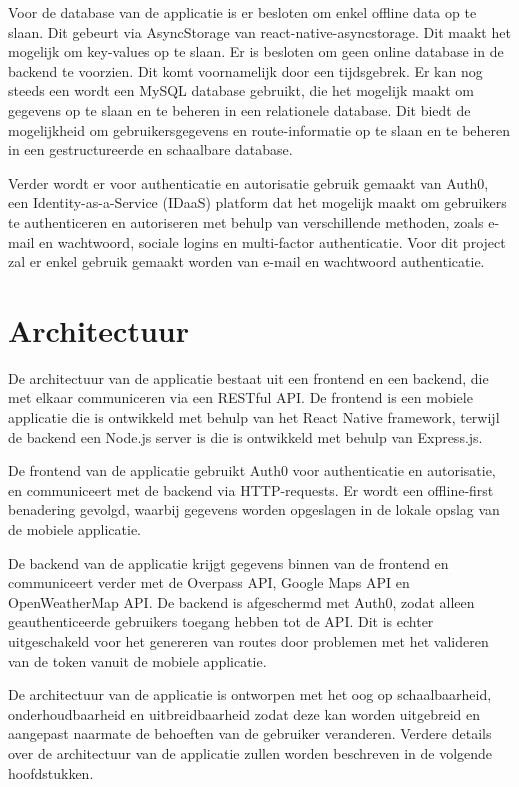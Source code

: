 Voor de database van de applicatie is er besloten om enkel offline data op te slaan. Dit gebeurt via AsyncStorage van react-native-asyncstorage. Dit maakt het mogelijk om key-values op te slaan. 
Er is besloten om geen online database in de backend te voorzien. Dit komt voornamelijk door een tijdsgebrek.
Er kan nog steeds een wordt een MySQL database gebruikt, die het mogelijk maakt om gegevens op te slaan en te beheren in een relationele database. Dit biedt de mogelijkheid om gebruikersgegevens en route-informatie op te slaan en te beheren in een gestructureerde en schaalbare database.

Verder wordt er voor authenticatie en autorisatie gebruik gemaakt van Auth0, een Identity-as-a-Service (IDaaS) platform dat het mogelijk maakt om gebruikers te authenticeren en autoriseren met behulp van verschillende methoden, zoals e-mail en wachtwoord, sociale logins en multi-factor authenticatie. Voor dit project zal er enkel gebruik gemaakt worden van e-mail en wachtwoord authenticatie.

\section{Architectuur}

De architectuur van de applicatie bestaat uit een frontend en een backend, die met elkaar communiceren via een RESTful API. De frontend is een mobiele applicatie die is ontwikkeld met behulp van het React Native framework, terwijl de backend een Node.js server is die is ontwikkeld met behulp van Express.js.

De frontend van de applicatie gebruikt Auth0 voor authenticatie en autorisatie, en communiceert met de backend via HTTP-requests. Er wordt een offline-first benadering gevolgd, waarbij gegevens worden opgeslagen in de lokale opslag van de mobiele applicatie.

De backend van de applicatie krijgt gegevens binnen van de frontend en communiceert verder met de Overpass API, Google Maps API en OpenWeatherMap API. De backend is afgeschermd met Auth0, zodat alleen geauthenticeerde gebruikers toegang hebben tot de API. Dit is echter uitgeschakeld voor het genereren van routes door problemen met het valideren van de token vanuit de mobiele applicatie.

De architectuur van de applicatie is ontworpen met het oog op schaalbaarheid, onderhoudbaarheid en uitbreidbaarheid zodat deze kan worden uitgebreid en aangepast naarmate de behoeften van de gebruiker veranderen. Verdere details over de architectuur van de applicatie zullen worden beschreven in de volgende hoofdstukken.

